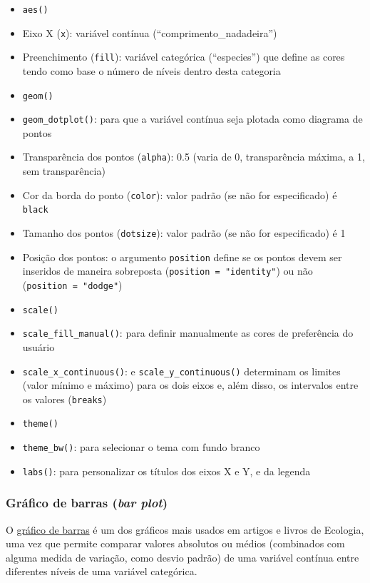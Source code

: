 \documentclass[
]{article}
\providecommand{\tightlist}{%
  \setlength{\itemsep}{0pt}\setlength{\parskip}{0pt}}
\begin{document}
\begin{itemize}
\tightlist
\item
  \texttt{aes()}
\item
  Eixo X (\texttt{x}): variável contínua (``comprimento\_nadadeira'')
\item
  Preenchimento (\texttt{fill}): variável categórica (``especies'') que define as cores tendo como base o número de níveis dentro desta categoria
\item
  \texttt{geom()}
\item
  \texttt{geom\_dotplot()}: para que a variável contínua seja plotada como diagrama de pontos
\item
  Transparência dos pontos (\texttt{alpha}): 0.5 (varia de 0, transparência máxima, a 1, sem transparência)
\item
  Cor da borda do ponto (\texttt{color}): valor padrão (se não for especificado) é \texttt{black}
\item
  Tamanho dos pontos (\texttt{dotsize}): valor padrão (se não for especificado) é 1
\item
  Posição dos pontos: o argumento \texttt{position} define se os pontos devem ser inseridos de maneira sobreposta (\texttt{position\ =\ "identity"}) ou não (\texttt{position\ =\ "dodge"})
\item
  \texttt{scale()}
\item
  \texttt{scale\_fill\_manual()}: para definir manualmente as cores de preferência do usuário
\item
  \texttt{scale\_x\_continuous()}: e \texttt{scale\_y\_continuous()} determinam os limites (valor mínimo e máximo) para os dois eixos e, além disso, os intervalos entre os valores (\texttt{breaks})
\item
  \texttt{theme()}
\item
  \texttt{theme\_bw()}: para selecionar o tema com fundo branco
\item
  \texttt{labs()}: para personalizar os títulos dos eixos X e Y, e da legenda
\end{itemize}

\hypertarget{gruxe1fico-de-barras-bar-plot}{%
\subsubsection{\texorpdfstring{Gráfico de barras (\emph{bar plot})}{Gráfico de barras (bar plot)}}\label{gruxe1fico-de-barras-bar-plot}}

O \href{https://www.data-to-viz.com/graph/barplot.html}{gráfico de barras} é um dos gráficos mais usados em artigos e livros de Ecologia, uma vez que permite comparar valores absolutos ou médios (combinados com alguma medida de variação, como desvio padrão) de uma variável contínua entre diferentes níveis de uma variável categórica.
\end{document}
